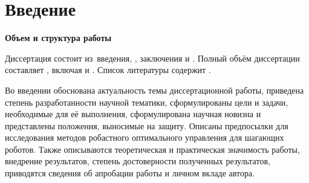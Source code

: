 \chapter*{Введение}                         %

\newcommand{\actuality}{\textbf{\actualityTXT}}
\newcommand{\progress}{\textbf{\progressTXT}}
\newcommand{\objectsubject}{\textbf{\objectsubjectTXT}}
\newcommand{\aimtasks}{\textbf{\aimtasksTXT}}
\newcommand{\methods}{\textbf{\methodsTXT}}
\newcommand{\defpositions}{\textbf{\defpositionsTXT}}
\newcommand{\compliances}{\textbf{\complianceTXT}}
\newcommand{\novelty}{\textbf{\noveltyTXT}}
\newcommand{\probation}{\textbf{\probationTXT}}
\newcommand{\influence}{\textbf{\influenceTXT}}
\newcommand{\reliability}{\textbf{\reliabilityTXT}}
\newcommand{\publications}{\textbf{\publicationsTXT}}
\newcommand{\contribution}{\textbf{\contributionTXT}}


\textbf{Объем и структура работы} 

Диссертация состоит из~введения,
,
заключения и
.
%
Полный объём диссертации составляет
, включая
 и
.
Список литературы содержит
.

Во введении обоснована актуальность темы диссертационной работы, приведена степень разработанности научной тематики, сформулированы цели и задачи, необходимые для её выполнения, сформулирована научная новизна и представлены положения, выносимые на защиту. Описаны предпосылки для исследования методов робастного оптимального управления для шагающих роботов. Также описываются теоретическая и практическая значимость работы, внедрение результатов, степень достоверности полученных результатов, приводятся сведения об апробации работы и личном вкладе автора. 


